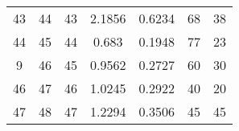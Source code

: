 \begin{table}
\begin{adjustbox}{width=1.2\textwidth,center=\textwidth}
\begin{tabular}{ccccccc}
43                                                        & 44                                                          & 43                                                  & 2.1856                                                                     & 0.6234                                                                    & 68                                                                          & 38                                                                               \\
44                                                        & 45                                                          & 44                                                  & 0.683                                                                      & 0.1948                                                                    & 77                                                                          & 23                                                                               \\
9                                                         & 46                                                          & 45                                                  & 0.9562                                                                     & 0.2727                                                                    & 60                                                                          & 30                                                                               \\
46                                                        & 47                                                          & 46                                                  & 1.0245                                                                     & 0.2922                                                                    & 40                                                                          & 20                                                                               \\
47                                                        & 48                                                          & 47                                                  & 1.2294                                                                     & 0.3506                                                                    & 45                                                                          & 45                                                                               \\

\end{tabular}
\end{adjustbox}
\end{table}
